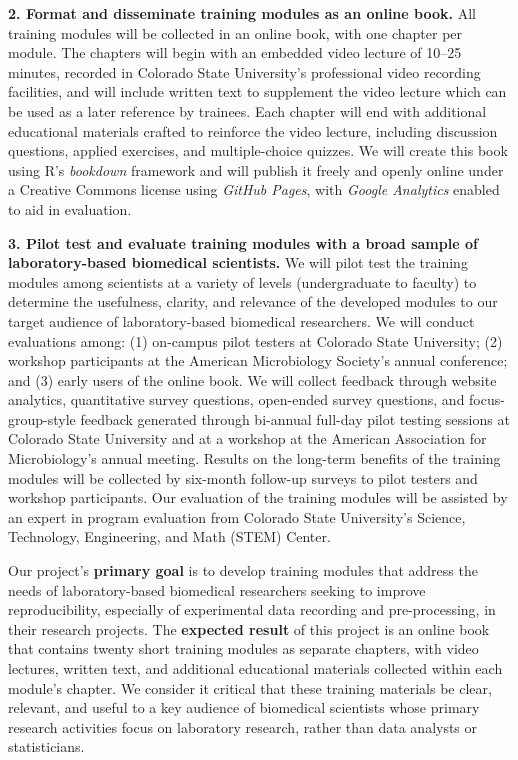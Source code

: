 \documentclass[pdftex,english,11.5pt,parskip=half]{scrartcl}
\begin{document}
\textbf{2. Format and disseminate training modules as an online book.} All training modules 
will be collected in an online book, with one chapter per module. The chapters will begin with 
an embedded video lecture of 10--25 minutes, recorded in Colorado State University's 
professional video recording facilities, and will include written text to supplement 
the video lecture which can be used as a later reference by trainees. Each chapter will end with additional educational materials crafted to reinforce the video lecture, including discussion questions, applied exercises, and multiple-choice quizzes. We will create this book using R's \textit{bookdown} framework and will publish it freely and openly online under a Creative Commons license using \textit{GitHub Pages}, with \textit{Google Analytics} enabled to aid in evaluation. 

\textbf{3. Pilot test and evaluate training modules with a broad sample of laboratory-based
biomedical scientists.} We will pilot test the training modules among scientists at a variety of levels (undergraduate to faculty) to determine the usefulness, clarity, and relevance of the developed modules to our target audience of laboratory-based biomedical researchers. We will conduct evaluations among: (1) on-campus pilot testers at Colorado State University; (2) workshop participants at the American Microbiology Society's annual conference; and (3) early users of the online book. We will collect feedback through website analytics, quantitative survey questions, open-ended survey questions, and focus-group-style feedback generated through bi-annual full-day pilot testing sessions at Colorado State University and at a workshop at the American Association for Microbiology's annual meeting. Results on the long-term benefits of the training modules will be collected by six-month follow-up surveys to pilot testers and workshop participants. Our evaluation of the training modules will be assisted by an expert in program evaluation from Colorado State University's Science, Technology, Engineering, and Math (STEM) Center. 

Our project's \textbf{primary goal} is to develop
training modules that address the needs of laboratory-based biomedical
researchers seeking to improve reproducibility, especially of experimental data
recording and pre-processing, in their research projects. The \textbf{expected result} of
this project is an online book that contains twenty short training modules as separate
chapters, with video lectures, written text, and additional educational
materials collected within each module's chapter. We consider it critical that
these training materials be clear, relevant, and useful to a key audience of
biomedical scientists whose primary research activities focus on laboratory
research, rather than data analysts or statisticians. 
\end{document}
